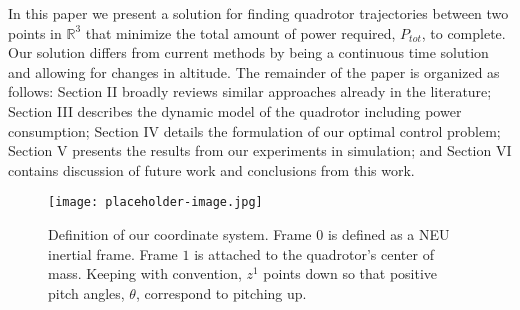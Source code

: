 In this paper we present a solution for finding quadrotor trajectories between two points in $\mathbb{R}^3$ that minimize the total amount of power required, $P_{tot}$, to complete. Our solution differs from current methods by being a continuous time solution and allowing for changes in altitude. The remainder of the paper is organized as follows: Section II broadly reviews similar approaches already in the literature; Section III describes the dynamic model of the quadrotor including power consumption; Section IV details the formulation of our optimal control problem; Section V presents the results from our experiments in simulation; and Section VI contains discussion of future work and conclusions from this work.

\begin{figure}[t]
    \label{QuadDiagram}
	\centering
	\texttt{[image: placeholder-image.jpg]}
	\caption{Definition of our coordinate system. Frame $0$ is defined as a NEU inertial frame. Frame $1$ is attached to the quadrotor's center of mass. Keeping with convention, $z^1$ points down so that positive pitch angles, $\theta$, correspond to pitching up.}
\end{figure}
